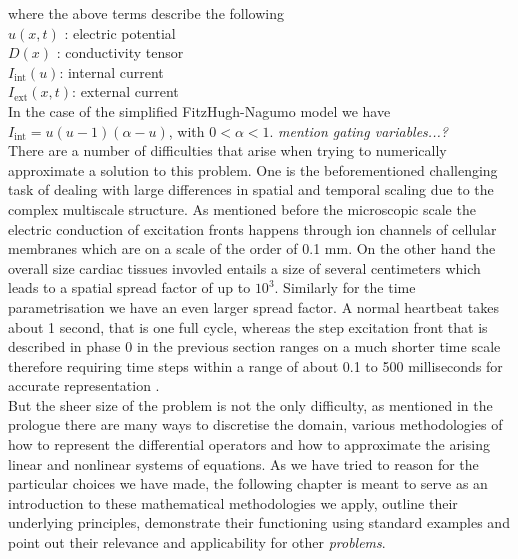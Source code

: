 \documentclass[../draft_1.tex]{subfiles}
\begin{document}
where the above terms describe the following 
\smallskip
\\
$u(x,t)$ : electric potential \\
$D(x) $  : conductivity tensor \\
$ I_{\text{int}}(u) $: internal current \\
$I_{\text{ext}}(x,t)$: external current 
\bigskip
\\
In the case of the simplified FitzHugh-Nagumo model we have $I_{\text{int}}= u (u - 1 )(\alpha - u)$, with $ 0 < \alpha < 1$. \textit{mention gating variables...? }
\smallskip
\\
There are a number of difficulties that arise when trying to numerically approximate a solution to this problem. One is the beforementioned challenging task of dealing with large differences in spatial and temporal scaling due to the complex multiscale structure. As mentioned before the microscopic scale the electric conduction of excitation fronts happens through ion channels of cellular membranes which are on a scale of the order of 0.1 mm. On the other hand the overall size cardiac tissues invovled entails a size of several centimeters which leads to a spatial spread factor of up to $10^3$. Similarly for the time parametrisation we have an even larger spread factor. A normal heartbeat takes about 1 second, that is one full cycle, whereas the step excitation front that is described in phase 0 in the previous section ranges on a much shorter time scale therefore requiring time steps within a range of about 0.1 to 500 milliseconds for accurate representation \cite{colli2004parallel}.
\smallskip
\\
But the sheer size of the problem is not the only difficulty, as mentioned in the prologue there are many ways to discretise the domain, various methodologies of how to represent the differential operators and how to approximate the arising linear and nonlinear systems of equations. As we have tried to reason for the particular choices we have made, the following chapter is meant to serve as an introduction to these mathematical methodologies we apply, outline their underlying principles, demonstrate their functioning using standard examples and point out their relevance and applicability for other \textit{problems}.
\end{document}
